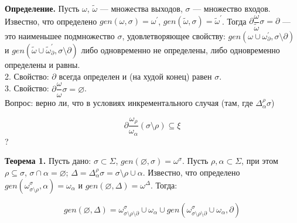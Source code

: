 





\hrulefill

\textbf{Определение.} Пусть $\omega$, $\tilde{\omega}$ --- множества выходов, $\sigma$ --- множество входов. Известно, что определено $gen(\omega, \sigma) = \omega^\prime$, $gen(\tilde{\omega}, \sigma) = \tilde{\omega}^\prime$. Тогда $\partial\dfrac{\omega}{\tilde{\omega}}\sigma = \partial$ --- это наименьшее подмножество $\sigma$, удовлетворяющее свойству: 
$gen(\omega \cup \omega^\prime_{\partial}, \sigma\setminus\partial)$ и
$gen(\tilde{\omega} \cup \tilde{\omega}^\prime_{\partial}, \sigma\setminus\partial)$ либо одновременно не определены, либо одновременно определены и равны. 
\\

2. Свойство: $\partial$ всегда определен и (на худой конец) равен $\sigma$.
\\

3. Свойство: $\partial\dfrac{\omega}{\omega}\sigma = \varnothing$.
\\

Вопрос: верно ли, что в условиях инкрементального случая (там, где $\Delta^\rho_\alpha\sigma$)

$$\partial\dfrac{\omega_\rho}{\omega_\alpha}(\sigma\setminus\rho)\subseteq\xi$$ ?

\begin{comment}
	\textbf{Доказательство:}

	\newcommand{\mypart}{\partial\dfrac{\omega_\rho}{\omega_\alpha}(\sigma\setminus\rho)}

	Докажем, что если $s \in \sigma\setminus\rho$, $s \notin \xi$, то $s \notin \mypart$. Обозначим $\tau = (\sigma\setminus\rho)\setminus\mypart$, тогда $\tau$ --- наибольшее подмножество $\sigma\setminus\rho$, такое, что $gen(\omega_\rho, \tau)$ определено $\Leftrightarrow$ $gen(\omega_\alpha, \tau)$ определено. Предположим, $s \in \mypart$, тогда $s \notin \tau$. Рассмотрим $gen(\omega_\rho, \tau)$.
\end{comment}

\newpage

\textbf{Теорема 1.} Пусть дано: $\sigma \subset \Sigma$, $gen(\varnothing, \sigma) = \omega^\sigma$. Пусть $\rho, \alpha \subset \Sigma$, при этом $\rho \subseteq \sigma$, $\sigma \cap \alpha = \varnothing$; $\Delta = \Delta^\rho_\alpha\sigma = \sigma\setminus\rho\cup\alpha$. Известно, что определено $gen(\omega^\sigma_{\sigma\setminus\rho}, \alpha) = \omega_\alpha$ и $gen(\varnothing, \Delta) = \omega^\Delta$.
Тогда:

$$gen(\varnothing, \Delta) = \omega^\sigma_{\sigma\setminus\rho\setminus\partial} \cup \omega_\alpha \cup gen(\omega^\sigma_{\sigma\setminus\rho\setminus\partial} \cup \omega_\alpha, \partial)$$
